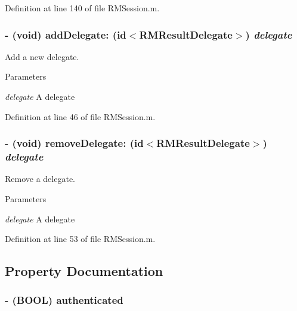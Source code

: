 Definition at line 140 of file RMSession.m.\hypertarget{interface_r_m_session_a20ee0730741132192d4245108509bbb8}{
\subsubsection[{addDelegate:}]{\setlength{\rightskip}{0pt plus 5cm}-\/ (void) addDelegate: (id$<${\bf RMResultDelegate}$>$) {\em delegate}}}
\label{interface_r_m_session_a20ee0730741132192d4245108509bbb8}


Add a new delegate. 
\begin{DoxyParams}{Parameters}
\item[{\em delegate}]A delegate \end{DoxyParams}


Definition at line 46 of file RMSession.m.\hypertarget{interface_r_m_session_a692b571f760d3c4e536b8c048721a61b}{
\subsubsection[{removeDelegate:}]{\setlength{\rightskip}{0pt plus 5cm}-\/ (void) removeDelegate: (id$<${\bf RMResultDelegate}$>$) {\em delegate}}}
\label{interface_r_m_session_a692b571f760d3c4e536b8c048721a61b}


Remove a delegate. 
\begin{DoxyParams}{Parameters}
\item[{\em delegate}]A delegate \end{DoxyParams}


Definition at line 53 of file RMSession.m.

\subsection{Property Documentation}
\hypertarget{interface_r_m_session_a71acbe4da4033e724b01e44d39ea2f24}{
\subsubsection[{authenticated}]{\setlength{\rightskip}{0pt plus 5cm}-\/ (BOOL) authenticated}}
\label{interface_r_m_session_a71acbe4da4033e724b01e44d39ea2f24}



